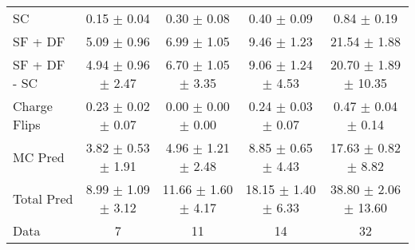 \begin{tabular}{l|cccc}
                                 SC &  0.15 $\pm$  0.04 &  0.30 $\pm$  0.08 &  0.40 $\pm$  0.09 &  0.84 $\pm$  0.19 \\
                            SF + DF &  5.09 $\pm$  0.96 &  6.99 $\pm$  1.05 &  9.46 $\pm$  1.23 & 21.54 $\pm$  1.88 \\
\hline
                       SF + DF - SC &  4.94 $\pm$  0.96 $\pm$  2.47 &  6.70 $\pm$  1.05 $\pm$  3.35 &  9.06 $\pm$  1.24 $\pm$  4.53 & 20.70 $\pm$  1.89 $\pm$ 10.35 \\
\hline\hline
                       Charge Flips &  0.23 $\pm$  0.02 $\pm$  0.07 &  0.00 $\pm$  0.00 $\pm$  0.00 &  0.24 $\pm$  0.03 $\pm$  0.07 &  0.47 $\pm$  0.04 $\pm$  0.14 \\
\hline
                            MC Pred &  3.82 $\pm$  0.53 $\pm$  1.91 &  4.96 $\pm$  1.21 $\pm$  2.48 &  8.85 $\pm$  0.65 $\pm$  4.43 & 17.63 $\pm$  0.82 $\pm$  8.82 \\
\hline
                         Total Pred &  8.99 $\pm$  1.09 $\pm$  3.12 & 11.66 $\pm$  1.60 $\pm$  4.17 & 18.15 $\pm$  1.40 $\pm$  6.33 & 38.80 $\pm$  2.06 $\pm$ 13.60 \\
\hline\hline
                               Data &     7 &    11 &    14 &    32 \\
\hline\hline
\end{tabular}

